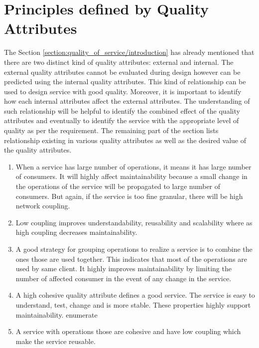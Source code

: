 {{{{{{{{\section{Principles defined by Quality Attributes}{\label{section:quality_of_service/quality_attributes_principle}
The Section \ref{section:quality_of_service/introduction} has already mentioned that there are two distinct kind of quality attributes: external and internal. The external quality attributes cannot be evaluated during design however can be predicted using the internal quality attributes. This kind of relationship can be used to design service with good quality. Moreover, it is important to identify how each internal attributes affect the external attributes. The understanding of such relationship will be helpful to identify the combined effect of the quality attributes and eventually to identify the service with the appropriate level of quality as per the requirement.
The remaining part of the section lists relationship existing in various quality attributes as well as the desired value of the quality attributes.
\begin{enumerate}
\item When a service has large number of operations, it means it has large number of consumers. It will highly affect maintainability because a small change in the operations of the service will be propagated to large number of consumers. But again, if the service is too fine granular, there will be high network coupling. \cite{Feuerlicht:2007aa, Xiao-jun:2015aa}\cite{Bianco:2007aa}

\item Low coupling improves understandability, reusability and scalability where as high coupling decreases maintainability. \cite{Kazemi:2011aa}\cite{Erl:2005aa}\cite{Josuttis:2007aa}

\item A good strategy for grouping operations to realize a service is to combine the ones those are used together.  This indicates that most of the operations are used by same client.  It highly improves maintainability by limiting the number of affected consumer in the event of any change in the service. \cite{Xiao-jun:2015aa}

\item A high cohesive quality attribute defines a good service. The service is easy to understand, test, change and is more stable. These properties highly support maintainability. {enumerate}\cite{np:2001aa}

\item A service with operations those are cohesive and have low coupling which make the service reusable. \cite{Washizakia:2003aa}\cite{Feuerlicht:2007aa}\cite{Ma:2009aa}


\end{enumerate}}}}}}}}}}
